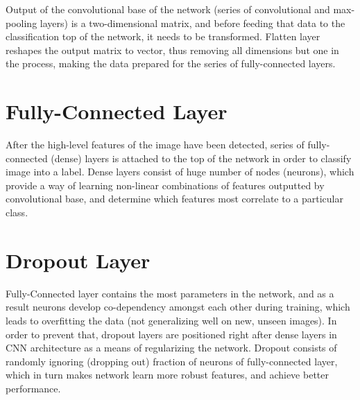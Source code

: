 Output of the convolutional base of the network (series of convolutional and max-pooling layers) is a two-dimensional matrix, and before feeding that data to the classification top of the network, it needs to be transformed. Flatten layer reshapes the output matrix to vector, thus removing all dimensions but one in the process, making the data prepared for the series of fully-connected layers.

\section{Fully-Connected Layer}

After the high-level features of the image have been detected, series of fully-connected (dense) layers is attached to the top of the network in order to classify image into a label. Dense layers consist of huge number of nodes (neurons), which provide a way of learning non-linear combinations of features outputted by convolutional base, and determine which features most correlate to a particular class.

\section{Dropout Layer}

Fully-Connected layer contains the most parameters in the network, and as a result neurons develop co-dependency amongst each other during training, which leads to overfitting the data (not generalizing well on new, unseen images). In order to prevent that, dropout layers are positioned right after dense layers in CNN architecture as a means of regularizing the network. Dropout consists of randomly ignoring (dropping out) fraction of neurons of fully-connected layer, which in turn makes network learn more robust features, and achieve better performance.
\clearpage
